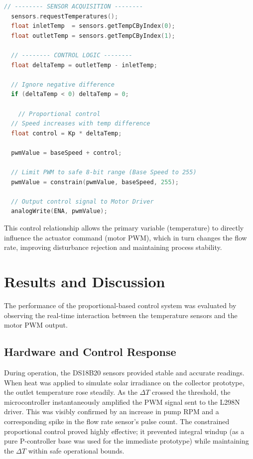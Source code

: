 \documentclass[12pt,a4paper]{report}
\begin{document}
\begin{lstlisting}[language=C]
  // -------- SENSOR ACQUISITION --------
  sensors.requestTemperatures();
  float inletTemp  = sensors.getTempCByIndex(0);
  float outletTemp = sensors.getTempCByIndex(1);

  // -------- CONTROL LOGIC --------
  float deltaTemp = outletTemp - inletTemp;

  // Ignore negative difference
  if (deltaTemp < 0) deltaTemp = 0;

    // Proportional control
  // Speed increases with temp difference
  float control = Kp * deltaTemp;

  pwmValue = baseSpeed + control;

  // Limit PWM to safe 8-bit range (Base Speed to 255)
  pwmValue = constrain(pwmValue, baseSpeed, 255);

  // Output control signal to Motor Driver
  analogWrite(ENA, pwmValue);
\end{lstlisting}

This control relationship allows the primary variable (temperature) to directly influence the actuator command (motor PWM), which in turn changes the flow rate, improving disturbance rejection and maintaining process stability.

\chapter{Results and Discussion}
The performance of the proportional-based control system was evaluated by observing the real-time interaction between the temperature sensors and the motor PWM output. 

\section{Hardware and Control Response}
During operation, the DS18B20 sensors provided stable and accurate readings. When heat was applied to simulate solar irradiance on the collector prototype, the outlet temperature rose steadily. As the $\Delta T$ crossed the threshold, the microcontroller instantaneously amplified the PWM signal sent to the L298N driver. This was visibly confirmed by an increase in pump RPM and a corresponding spike in the flow rate sensor's pulse count. The constrained proportional control proved highly effective; it prevented integral windup (as a pure P-controller base was used for the immediate prototype) while maintaining the $\Delta T$ within safe operational bounds.
\end{document}
